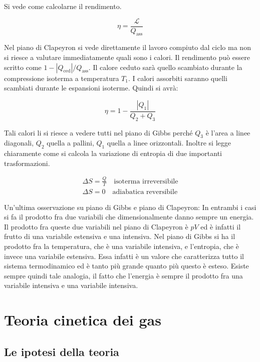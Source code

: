 \begin{figure}[htpb]
\begin{tikzpicture}[x=0.75pt,y=0.75pt,yscale=-1,xscale=1]
	\end{tikzpicture}
\end{figure}
\FloatBarrier
Si vede come calcolarne il rendimento.

\[
	\eta = \frac{\mathcal{L} }{Q_{\text{ass} } }
\]

Nel piano di Clapeyron si vede direttamente il lavoro compiuto dal ciclo ma non si riesce a valutare immediatamente quali sono i calori. Il rendimento può essere scritto come $1-|Q_\text{ced}|/Q_\text{ass}$. Il calore ceduto sarà quello scambiato durante la compressione isoterma a temperatura $T_1$. I calori assorbiti saranno quelli scambiati durante le espansioni isoterme. Quindi si avrà:

\[
	\eta = 1 - \frac{|Q_1|}{Q_2+Q_3}
\]

Tali calori li si riesce a vedere tutti nel piano di Gibbs perché $Q_3$ è l'area a linee diagonali, $Q_2$ quella a pallini, $Q_1$ quella a linee orizzontali.
Inoltre si legge chiaramente come si calcola la variazione di entropia di due importanti trasformazioni.

\begin{gather*}
	\Delta S = \frac{Q}{T} \quad \text{isoterma irreversibile} \\
	\Delta S = 0 \quad \text{adiabatica reversibile}
\end{gather*}

Un'ultima osservazione su piano di Gibbs e piano di Clapeyron: In entrambi i casi si fa il prodotto fra due variabili che dimensionalmente danno sempre un energia. Il prodotto fra queste due variabili nel piano di Clapeyron è $pV$ ed è infatti il frutto di una variabile estensiva e una intensiva. Nel piano di Gibbs si ha il prodotto fra la temperatura, che è una variabile intensiva, e l'entropia, che è invece una variabile estensiva. Essa infatti è un valore che caratterizza tutto il sistema termodinamico ed è tanto più grande quanto più questo è esteso. Esiste sempre quindi tale analogia, il fatto che l'energia è sempre il prodotto fra una variabile intensiva e una variabile intensiva.

\section{Teoria cinetica dei gas}

\subsection{Le ipotesi della teoria}

